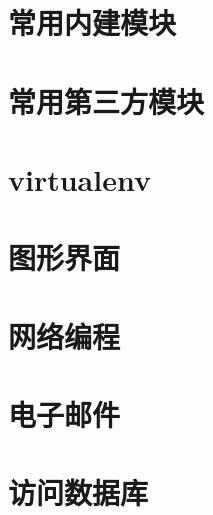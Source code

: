 \newpage
\section{常用内建模块}

\newpage

\newpage

\newpage

\newpage

\newpage

\newpage

\newpage

\newpage

\newpage

\newpage

\newpage




\newpage
\section{常用第三方模块}

\newpage

\newpage

\newpage

\newpage



\newpage
\section{virtualenv}



\newpage
\section{图形界面}

\newpage



\newpage
\section{网络编程}

\newpage

\newpage

\newpage



\newpage
\section{电子邮件}

\newpage

\newpage



\newpage
\section{访问数据库}

\newpage

\newpage

\newpage



